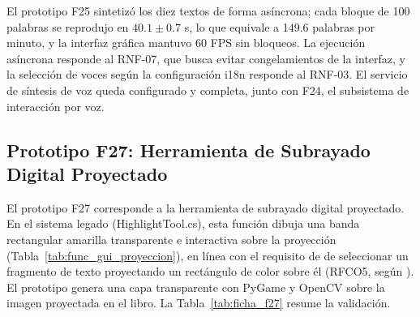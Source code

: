El prototipo F25 sintetizó los diez textos de forma asíncrona; cada bloque de 100 palabras se reprodujo en $40.1 \pm 0.7$ s, lo que equivale a 149.6 palabras por minuto, y la interfaz gráfica mantuvo 60 FPS sin bloqueos. La ejecución asíncrona responde al RNF-07, que busca evitar congelamientos de la interfaz, y la selección de voces según la configuración i18n responde al RNF-03. El servicio de síntesis de voz queda configurado y completa, junto con F24, el subsistema de interacción por voz.
 
\subsection{Prototipo F27: Herramienta de Subrayado Digital Proyectado}
 
El prototipo F27 corresponde a la herramienta de subrayado digital proyectado. En el sistema legado (HighlightTool.cs), esta función dibuja una banda rectangular amarilla transparente e interactiva sobre la proyección (Tabla~\ref{tab:func_gui_proyeccion}), en línea con el requisito de \cite{contreras2019desarrollo} de seleccionar un fragmento de texto proyectando un rectángulo de color sobre él (RFCO5, según \cite{ibaceta2023evaluacion}). El prototipo genera una capa transparente con PyGame y OpenCV sobre la imagen proyectada en el libro. La Tabla~\ref{tab:ficha_f27} resume la validación.
 

